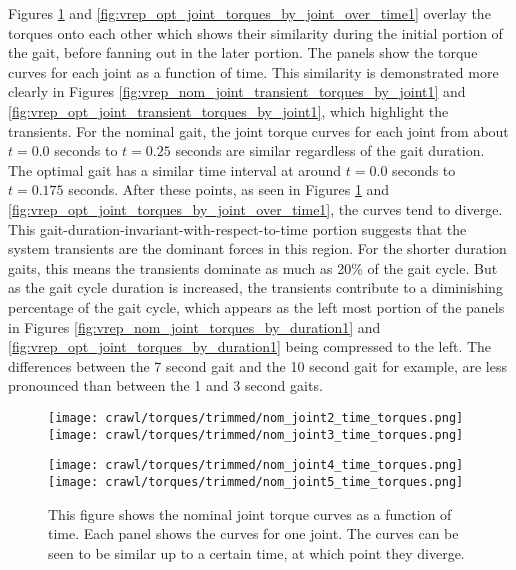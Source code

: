 Figures \ref{fig:vrep_nom_joint_torques_by_joint_over_time1} and 
\ref{fig:vrep_opt_joint_torques_by_joint_over_time1} overlay the torques onto each other
which shows their similarity during the initial portion of the gait, before fanning out
in the later portion.
The panels show the torque curves for each joint as a function of time.
This similarity is demonstrated more clearly in Figures \ref{fig:vrep_nom_joint_transient_torques_by_joint1}
and \ref{fig:vrep_opt_joint_transient_torques_by_joint1}, which highlight the transients.
For the nominal gait, the joint torque curves for each joint from about $t = 0.0$ seconds to $t = 0.25$ seconds
are similar regardless of the gait duration. The optimal gait has a similar time interval
at around $t = 0.0$ seconds to $t = 0.175$ seconds. After these points, as seen in Figures 
\ref{fig:vrep_nom_joint_torques_by_joint_over_time1} and 
\ref{fig:vrep_opt_joint_torques_by_joint_over_time1}, the curves tend to diverge.
This gait-duration-invariant-with-respect-to-time portion suggests that the system transients are the dominant
forces in this region. For the shorter duration gaits, this means the transients dominate as much as
20\% of the gait cycle. But as the gait cycle duration is increased, the transients
contribute to a diminishing percentage of the gait cycle, which appears as the left most
portion of the panels in Figures \ref{fig:vrep_nom_joint_torques_by_duration1} and 
\ref{fig:vrep_opt_joint_torques_by_duration1} being compressed to the left. 
The differences between the 7 second gait and the 10 second gait for example,
are less pronounced than between the 1 and 3 second gaits.

\begin{figure}
  \centerline{
    \texttt{[image: crawl/torques/trimmed/nom\_joint2\_time\_torques.png]}
    \texttt{[image: crawl/torques/trimmed/nom\_joint3\_time\_torques.png]}
  }
  \centerline{
    \texttt{[image: crawl/torques/trimmed/nom\_joint4\_time\_torques.png]}
    \texttt{[image: crawl/torques/trimmed/nom\_joint5\_time\_torques.png]}
  }
  \caption{This figure shows the nominal joint torque curves as a function of time.
           Each panel shows the curves for one joint. The curves can be seen to be similar
           up to a certain time, at which point they diverge.}
  \label{fig:vrep_nom_joint_torques_by_joint_over_time1}
\end{figure}

